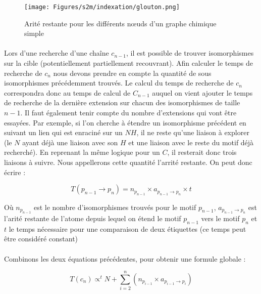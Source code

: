 \documentclass[12pt,french,twoside]{report}
\begin{document}
\begin{figure}
  \texttt{[image: Figures/s2m/indexation/glouton.png]}
  \caption{\label{arrite}Arité restante pour les différents n\oe{}uds d'un graphe chimique simple}
\end{figure}

\paragraph{}Lors d'une recherche d'une chaîne $c_{n-1}$, il est possible de trouver isomorphismes sur la cible
(potentiellement partiellement recouvrant). Afin calculer le temps de recherche de $c_n$ nous devons prendre en compte
la quantité de sous isomorphismes précédemment trouvés. Le calcul du temps de recherche de $c_n$ correspondra donc au temps de
calcul de $C_{n-1}$ auquel on vient ajouter le temps de recherche de la dernière extension sur chacun des isomorphismes de taille
$n-1$. Il faut également tenir compte du nombre d'extensions qui vont être essayées. Par exemple, si l'on cherche à étendre un
isomorphisme précédent en suivant un lien qui est enraciné sur un $NH$, il ne reste qu'une liaison à explorer (le $N$ ayant déjà
une liaison avec son $H$ et une liaison avec le reste du motif déjà recherché). En reprenant la même logique pour un $C$, il
resterait donc trois liaisons à suivre. Nous appellerons cette quantité l'arrité restante. On peut donc écrire :

\begin{equation}
 T(p_{n-1} \rightarrow p_n) = n_{p_{n-1}} \times a_{p_{n-1} \rightarrow p_n} \times t
\end{equation}

Où $n_{p_{n-1}}$ est le nombre d'isomorphismes trouvés pour le motif $p_{n-1}$, $a_{p_{n-1} \rightarrow p_n}$ est l'arité restante
de l'atome depuis lequel on étend le motif $p_{n-1}$ vers le motif $p_n$ et $t$ le temps nécessaire pour une comparaison de deux
étiquettes (ce temps peut être considéré constant)

\paragraph{}Combinons les deux équations précédentes, pour obtenir une formule globale :

\begin{equation}
 T(c_n) \propto^t N + \sum_{i=2}^n (n_{p_{i-1}} \times a_{p_{i-1} \rightarrow p_i})
\end{equation}
\end{document}
